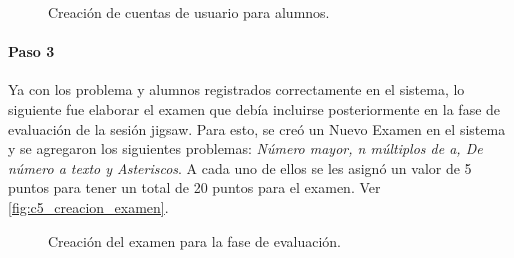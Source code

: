 \begin{figure}[h!]
	\centering
	\caption{Creación de cuentas de usuario para alumnos.}
	\label{fig:c5_creacion_alumnos}
\end{figure}

\paragraph{Paso 3}
Ya con los problema y alumnos registrados correctamente en el sistema, lo siguiente fue elaborar el examen que debía incluirse posteriormente en la fase de evaluación de la sesión jigsaw. Para esto, se creó un Nuevo Examen en el sistema y se agregaron los siguientes problemas: \emph{Número mayor, n múltiplos de a, De número a texto y Asteriscos}. A cada uno de ellos se les asignó un valor de 5 puntos para tener un total de 20 puntos para el examen. Ver \autoref{fig:c5_creacion_examen}.

\begin{figure}[h!]
	\centering
	\caption{Creación del examen para la fase de evaluación.}
	\label{fig:c5_creacion_examen}
\end{figure}

